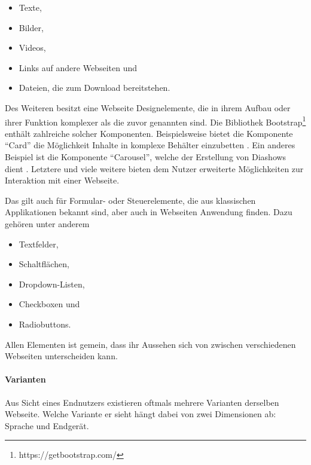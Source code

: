         \begin{itemize}
            \item Texte,
            \item Bilder,
            \item Videos,
            \item Links auf andere Webseiten und
            \item Dateien, die zum Download bereitstehen.
        \end{itemize}

        Des Weiteren besitzt eine Webseite Designelemente,
        die in ihrem Aufbau oder ihrer Funktion komplexer
        als die zuvor genannten sind.
        Die Bibliothek Bootstrap\footnote{https://getbootstrap.com/}
        enthält zahlreiche solcher Komponenten.
        Beispielsweise bietet die Komponente "`Card"' die Möglichkeit
        Inhalte in komplexe Behälter einzubetten \cite{bootstrap:Cards}.
        Ein anderes Beispiel ist die Komponente "`Carousel"',
        welche der Erstellung von Diashows dient \cite{bootstrap:Carousel}.
        Letztere und viele weitere bieten dem Nutzer
        erweiterte Möglichkeiten zur Interaktion mit einer Webseite.

        Das gilt auch für Formular- oder Steuerelemente,
        die aus klassischen Applikationen bekannt sind,
        aber auch in Webseiten Anwendung finden.
        Dazu gehören unter anderem

        \begin{itemize}
            \item Textfelder,
            \item Schaltflächen,
            \item Dropdown-Listen,
            \item Checkboxen und
            \item Radiobuttons.
        \end{itemize}

        Allen Elementen ist gemein, dass ihr Aussehen sich von
        zwischen verschiedenen Webseiten unterscheiden kann.

        \paragraph{Varianten}
        Aus Sicht eines Endnutzers existieren oftmals mehrere
        Varianten derselben Webseite.
        Welche Variante er sieht hängt dabei von zwei Dimensionen ab:
        Sprache und Endgerät.

